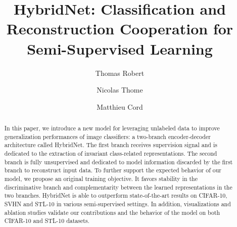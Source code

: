 \documentclass[runningheads]{llncs}
\begin{document}
\pagestyle{headings}
\mainmatter




\title{HybridNet: Classification and Reconstruction Cooperation for Semi-Supervised Learning}



\author{Thomas Robert \and Nicolas Thome \and Matthieu Cord}


\newcommand{\vx}{\mathbf{x}}
\newcommand{\vxh}{\hat{\mathbf{x}}}
\newcommand{\vy}{\mathbf{y}}
\newcommand{\vz}{\mathbf{z}}
\newcommand{\vyh}{\hat{\mathbf{y}}}
\newcommand{\vh}{\mathbf{h}}
\newcommand{\vhh}{\hat{\mathbf{h}}}
\newcommand{\calL}{\mathcal{L}}
\newcommand{\kk}{^{(k)}}

\maketitle

\begin{abstract}
In this paper, we introduce a new model for leveraging unlabeled data to improve generalization performances of image classifiers: a two-branch encoder-decoder architecture called HybridNet. The first branch receives supervision signal and is dedicated to the extraction of invariant class-related representations. The second branch is fully un\-supervised and dedicated to model information  discarded by the first branch to reconstruct input data. To further support the expected behavior of our model, we propose an original training objective. It favors stability in the discriminative branch and complementarity between the learned representations in the two branches. HybridNet is able to outperform state-of-the-art results on CIFAR-10, SVHN and STL-10 in various semi-supervised settings. In addition, visualizations and ablation studies validate our contributions and the behavior of the model on both CIFAR-10 and STL-10 datasets.

\end{abstract}
\end{document}

